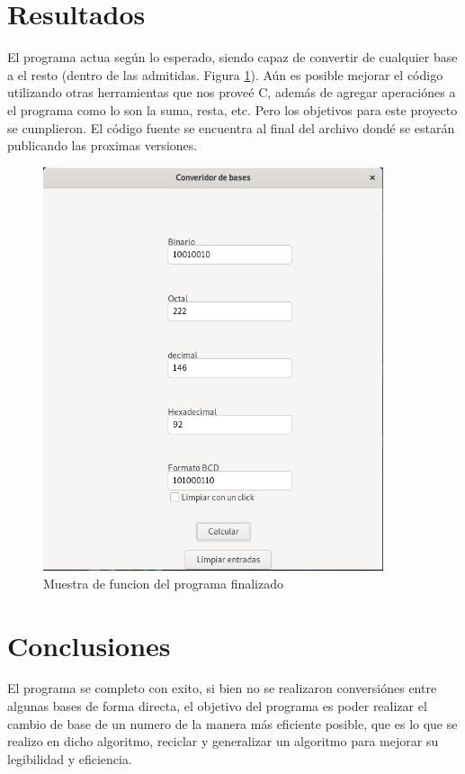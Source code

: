 \documentclass[letterpaper,12pt]{extarticle}%
\begin{document}
	\renewcommand{\labelenumi}{\arabic{enumi}.}
    
    	
    \section{Resultados}
		El programa actua según lo esperado, siendo capaz de convertir de cualquier base a el resto (dentro de las admitidas. Figura \ref{programFuntion}).
		Aún es posible mejorar el código utilizando otras herramientas que nos proveé C, además de agregar aperaciónes a el programa
		como lo son la suma, resta, etc. Pero los objetivos para este proyecto se cumplieron. El código fuente se encuentra al final del archivo dondé se
		estarán publicando las proximas versiones.		
		\begin{figure}[H]
		\begin{center}
		\includegraphics[width=10cm]{imag//programFuntion.png}
		\caption{Muestra de funcion del programa finalizado}
		\label{programFuntion}
		\end{center}
		\end{figure}

	    
	    \section{Conclusiones}
		El programa se completo con exito, si bien no se realizaron conversiónes entre algunas bases
		de forma directa, el objetivo del programa es poder realizar el cambio de base de un numero de
		la manera más eficiente posible, que es lo que se realizo en dicho algoritmo, reciclar y generalizar
		un algoritmo para mejorar su legibilidad y eficiencia.
		
\end{document}
